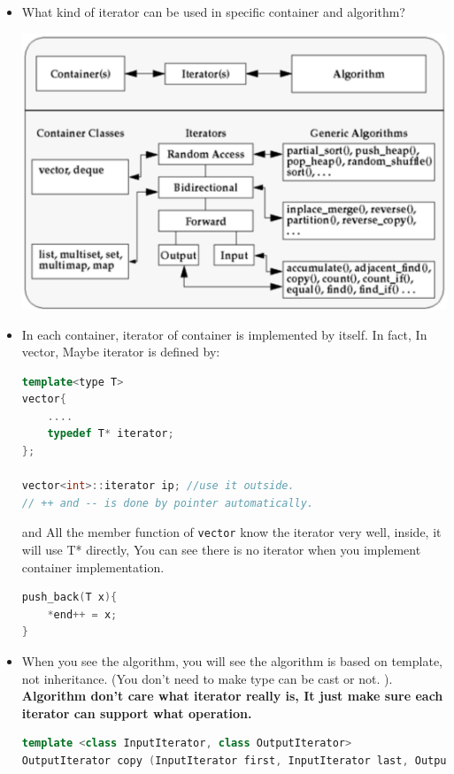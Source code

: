 \documentclass[a4paper,11pt,twoside]{book}
\begin{document}
\begin{itemize}
	\item What kind of iterator can be used in specific container and algorithm?
\begin{center}
	  \includegraphics[scale=0.56]{pics/container_it.png}
\end{center}

\item In each container, iterator of container is implemented by itself. In fact, In vector, Maybe iterator is defined by:
\begin{lstlisting}[frame=single, language=c++]
template<type T>
vector{
	....
	typedef T* iterator;
};

vector<int>::iterator ip; //use it outside.
// ++ and -- is done by pointer automatically.
\end{lstlisting}

and All the member function of \texttt{vector} know the iterator very well, inside, it will use T* directly, You can see there is no iterator when you implement container implementation.
\begin{lstlisting}[frame=single, language=c++]
push_back(T x){
	*end++ = x;
}  
\end{lstlisting}

	\item When you see the algorithm,  you will see the algorithm is based on template, not inheritance. (You don't need to make type can be cast or not. ). \textbf{Algorithm don't care what iterator really is, It just make sure each iterator can support what operation. }
\begin{lstlisting}[frame=single, language=c++]
template <class InputIterator, class OutputIterator>
OutputIterator copy (InputIterator first, InputIterator last, OutputIterator result);
\end{lstlisting}


\end{itemize}
\end{document}
